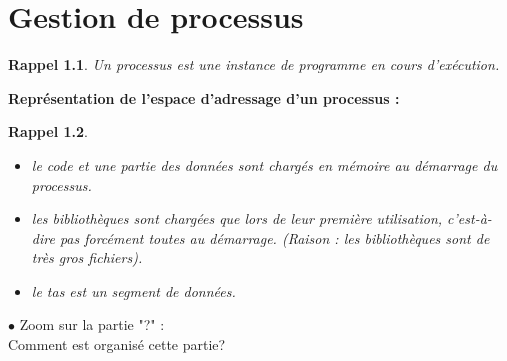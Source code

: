 \documentclass[12pt,a4paper]{report}
\newtheorem*{rap}{Rappel}
\begin{document}
\chapter{Gestion de processus}

\begin{rap} Un processus est une instance de programme en cours
 d'exécution. \end{rap}

\textbf{Représentation de l'espace d'adressage d'un processus :}
\begin{center}
\end{center}

\begin{rap}
\begin{itemize}
\item le code et une partie des données sont chargés en mémoire au démarrage du processus.
\item les bibliothèques sont chargées que lors de leur première utilisation, c'est-à-dire pas forcément toutes au démarrage. (Raison : les bibliothèques sont de très gros fichiers).
\item le tas est un segment de données.
\\
\end{itemize}
\end{rap}

$\bullet$ Zoom sur la partie "?" :\\
Comment est organisé cette partie?

\medskip
\end{document}
